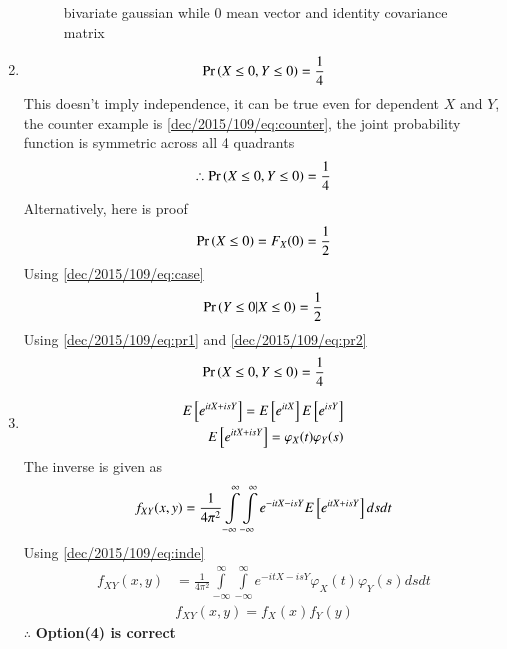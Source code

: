 \begin{enumerate}
\begin{figure}[!ht]
\caption{bivariate gaussian while 0 mean vector and identity covariance matrix}
\label{dec/2015/109/plot}
\end{figure}
\item
\begin{align}
\Pr\left(X\le 0, Y\le0\right)=\frac{1}{4}
\end{align}
This doesn't imply independence, it can be true even for dependent $X$ and $Y$, the counter example is \eqref{dec/2015/109/eq:counter}, the joint probability function is symmetric across all 4 quadrants
\begin{align}
\therefore \Pr\left(X\le 0, Y\le0\right)=\frac{1}{4}
\end{align}
Alternatively, here is proof 
\begin{align}
\Pr\left(X\le 0\right)=F_X(0)=\frac{1}{2} \label{dec/2015/109/eq:pr1}
\end{align}
Using \eqref{dec/2015/109/eq:case}
\begin{align}
\Pr\left(Y\le 0|X\le 0\right)=\frac{1}{2} \label{dec/2015/109/eq:pr2}
\end{align}
Using \eqref{dec/2015/109/eq:pr1} and \eqref{dec/2015/109/eq:pr2}
\begin{align}
\Pr\left(X\le 0, Y\le0\right)=\frac{1}{4}
\end{align}
\item
\begin{align}
E{}\left[e^{itX+isY}\right]=E{}\left[e^{itX}\right]E{}\left[e^{isY}\right]\\
E{}\left[e^{itX+isY}\right]=\varphi_X(t)\varphi_Y(s) \label{dec/2015/109/eq:inde}
\end{align}
The inverse is given as
\begin{align}
f_{XY}(x,y)=\frac{1}{4\pi^2}\displaystyle \int\limits_{-\infty}^{\infty} \int\limits_{-\infty}^{\infty} e^{-itX-isY}E{}\left[e^{itX+isY}\right]ds dt
\end{align}
Using \eqref{dec/2015/109/eq:inde}
\begin{align}
f_{XY}(x,y)&=\frac{1}{4\pi^2}\displaystyle \int\limits_{-\infty}^{\infty} \int\limits_{-\infty}^{\infty} e^{-itX-isY}\varphi_X(t)\varphi_Y(s) ds dt\\
&f_{XY}(x,y)=f_X(x)f_Y(y)
\end{align}
$\therefore$ \textbf{Option(4) is correct}
\end{enumerate}


